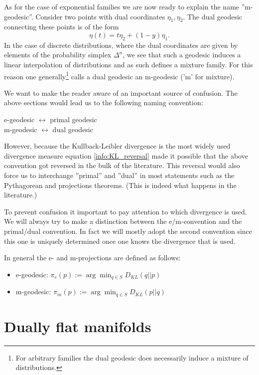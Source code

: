     As for the case of exponential families we are now ready to explain the name ''m-geodesic''. Consider two points with dual coordinates $\eta_1,\eta_2$. The dual geodesic connecting these points is of the form \[\eta(t) = t\eta_2 + (1-y)\eta_1.\] In the case of discrete distributions, where the dual coordinates are given by elements of the probability simplex $\Delta^n$, we see that such a geodesic induces a linear interpolation of distributions and as such defines a mixture family. For this reason one generally\footnote{For arbitrary families the dual geodesic does necessarily induce a mixture of distributions.} calls a dual geodesic an m-geodesic ('m' for mixture).

    \begin{remark}
        We want to make the reader aware of an important source of confusion. The above sections would lead us to the following naming convention:
        \begin{center}
            e-geodesic $\leftrightarrow$ primal geodesic\\
            m-geodesic $\leftrightarrow$ dual geodesic
        \end{center}
        However, because the Kullback-Leibler divergence is the most widely used divergence measure equation \ref{info:KL_reversal} made it possible that the above convention got reversed in the bulk of the literature. This reversal would also force us to interchange ''primal'' and ''dual'' in most statements such as the Pythagorean and projections theorems. (This is indeed what happens in the literature.)

        To prevent confusion it important to pay attention to which divergence is used. We will always try to make a distinction between the e/m-convention and the primal/dual convention. In fact we will mostly adopt the second convention since this one is uniquely determined once one knows the divergence that is used.

        In general the e- and m-projections are defined as follows:
        \begin{itemize}
            \item e-geodesic: $\pi_e(p) := \arg\min_{q\in S} D_{KL}(q||p)$
            \item m-geodesic: $\pi_m(p) := \arg\min_{q\in S} D_{KL}(p||q)$
        \end{itemize}
    \end{remark}

\section{Dually flat manifolds}
